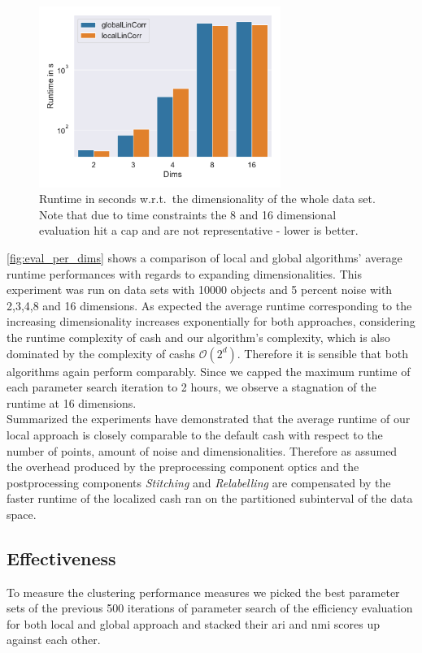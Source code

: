 \begin{figure}[h]
    \centering
        \includegraphics[width=0.7\textwidth]{new_evaluation/per_dims/Avg_Runtime_O10000_N5_pdims_bar.pdf}
    \caption{Runtime in seconds w.r.t.\ the dimensionality of the whole data set. Note that due to time constraints the 8 and 16 dimensional evaluation hit a cap and are not representative - lower is better.}
    \label{fig:eval_per_dims}
\end{figure}

\autoref{fig:eval_per_dims} shows a comparison of local and global algorithms' average runtime performances with regards to expanding dimensionalities. This experiment was run on data sets with 10000 objects and 5 percent noise with 2,3,4,8 and 16 dimensions. As expected the average runtime corresponding to the increasing dimensionality increases exponentially for both approaches, considering the runtime complexity of \gls{cash} and our algorithm's complexity, which is also dominated by the complexity of \gls{cash}s $\mathcal{O}(2^d)$. Therefore it is sensible that both algorithms again perform comparably.
Since we capped the maximum runtime of each parameter search iteration to 2 hours, we observe a stagnation of the runtime at 16 dimensions.\\

Summarized the experiments have demonstrated that the average runtime of our local approach is closely comparable to the default \gls{cash} with respect to the number of points, amount of noise and dimensionalities. Therefore as assumed the overhead produced by the preprocessing component \gls{optics} and the postprocessing components \textit{Stitching} and \textit{Relabelling} are compensated by the faster runtime of the localized \gls{cash} ran on the partitioned subinterval of the data space. 
 
\subsection{Effectiveness}
To measure the clustering performance measures we picked the best parameter sets of the previous 500 iterations of parameter search of the efficiency evaluation for both local and global approach and stacked their \gls{ari} and \gls{nmi} scores up against each other. 


